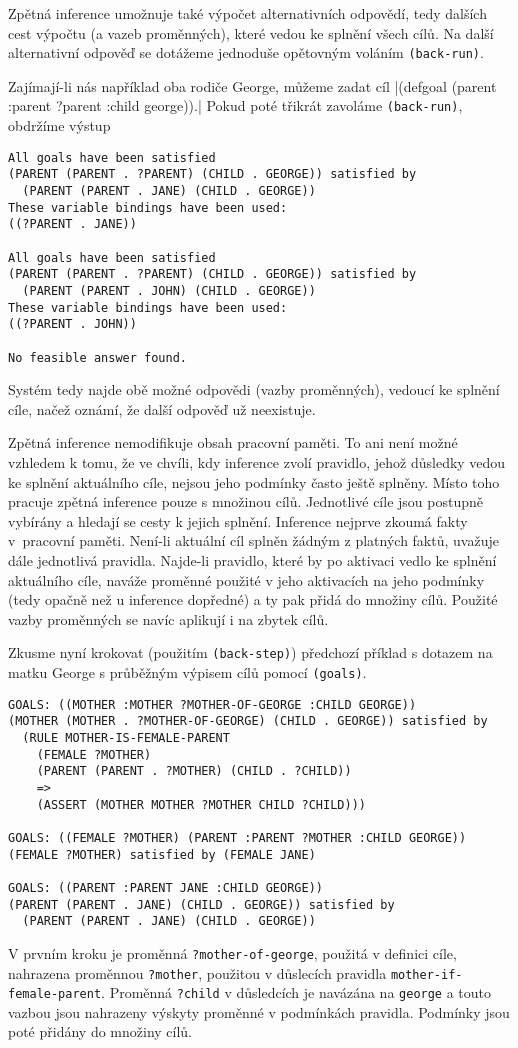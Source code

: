 Zpětná inference umožnuje také výpočet alternativních odpovědí, tedy dalších
cest výpočtu (a vazeb proměnných), které vedou ke splnění všech cílů. Na další
alternativní odpověď se dotážeme jednoduše opětovným voláním \verb|(back-run)|.

Zajímají-li nás například oba rodiče George, můžeme zadat cíl
\cl|(defgoal (parent :parent ?parent :child george)).|
Pokud poté třikrát zavoláme \verb|(back-run)|, obdržíme výstup
\begin{verbatim}
All goals have been satisfied
(PARENT (PARENT . ?PARENT) (CHILD . GEORGE)) satisfied by
  (PARENT (PARENT . JANE) (CHILD . GEORGE))
These variable bindings have been used:
((?PARENT . JANE))

All goals have been satisfied
(PARENT (PARENT . ?PARENT) (CHILD . GEORGE)) satisfied by
  (PARENT (PARENT . JOHN) (CHILD . GEORGE))
These variable bindings have been used:
((?PARENT . JOHN))

No feasible answer found.
\end{verbatim}
Systém tedy najde obě možné odpovědi (vazby proměnných), vedoucí ke splnění
cíle, načež oznámí, že další odpověď už neexistuje.

Zpětná inference nemodifikuje obsah pracovní paměti. To ani není možné vzhledem
k tomu, že ve chvíli, kdy inference zvolí pravidlo, jehož důsledky vedou ke
splnění aktuálního cíle, nejsou jeho podmínky často ještě splněny. Místo toho
pracuje zpětná inference pouze s množinou cílů. Jednotlivé cíle jsou postupně
vybírány a hledají se cesty k jejich splnění. Inference nejprve zkoumá fakty
v~pracovní paměti. Není-li aktuální cíl splněn žádným z platných faktů, uvažuje
dále jednotlivá pravidla. Najde-li pravidlo, které by po aktivaci vedlo ke
splnění aktuálního cíle, naváže proměnné použité v jeho aktivacích na jeho
podmínky (tedy opačně než u inference dopředné) a ty pak přidá do množiny cílů.
Použité vazby proměnných se navíc aplikují i na zbytek cílů.

Zkusme nyní krokovat (použitím \verb|(back-step)|) předchozí příklad s dotazem na
matku George s průběžným výpisem cílů pomocí \verb|(goals)|.
\begin{verbatim}
GOALS: ((MOTHER :MOTHER ?MOTHER-OF-GEORGE :CHILD GEORGE))
(MOTHER (MOTHER . ?MOTHER-OF-GEORGE) (CHILD . GEORGE)) satisfied by
  (RULE MOTHER-IS-FEMALE-PARENT
    (FEMALE ?MOTHER)
    (PARENT (PARENT . ?MOTHER) (CHILD . ?CHILD))
    =>
    (ASSERT (MOTHER MOTHER ?MOTHER CHILD ?CHILD)))

GOALS: ((FEMALE ?MOTHER) (PARENT :PARENT ?MOTHER :CHILD GEORGE))
(FEMALE ?MOTHER) satisfied by (FEMALE JANE)

GOALS: ((PARENT :PARENT JANE :CHILD GEORGE))
(PARENT (PARENT . JANE) (CHILD . GEORGE)) satisfied by
  (PARENT (PARENT . JANE) (CHILD . GEORGE))
\end{verbatim}
V prvním kroku je proměnná \verb|?mother-of-george|, použitá v definici cíle,
nahrazena proměnnou \verb|?mother|, použitou v důslecích pravidla
\verb|mother-if-female-parent|. Proměnná \verb|?child| v důsledcích je navázána
na \verb|george| a touto vazbou jsou nahrazeny výskyty proměnné v podmínkách
pravidla. Podmínky jsou poté přidány do množiny cílů.

